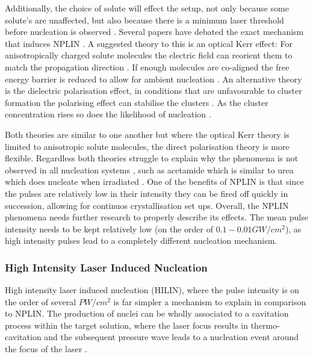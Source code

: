Additionally, the choice of solute will effect the setup, not 
only because some solute's are unaffected, but also because 
there is a minimum laser threshold before nucleation is observed 
\cite{Garetz2002}. Several papers have debated the exact mechanism 
that induces NPLIN \cite{Garetz2002, Knott2011}. A suggested 
theory to this is an optical Kerr effect: For anisotropically 
charged solute molecules the electric field can reorient them 
to match the propagation direction \cite{Garetz2002}. If enough 
molecules are co-aligned the free energy barrier is reduced to 
allow for ambient nucleation \cite{Knott2011}. An alternative 
theory is the dielectric polarisation effect, in conditions that 
are unfavourable to cluster formation the polarising effect can 
stabilise the clusters \cite{Alexander2008}. As the cluster 
concentration rises so does the likelihood of nucleation 
\cite{Vekilov2010}. 

Both theories are similar to one another but where the optical 
Kerr theory is limited to anisotropic solute molecules, the 
direct polarisation theory is more flexible. Regardless both 
theories struggle to explain why the phenomena is not observed 
in all nucleation systems \cite{Korede2023}, such as acetamide 
which is similar to urea which does nucleate when irradiated 
\cite{Ward2016}. One of the benefits of NPLIN is that since the 
pulses are relatively low in their intensity they can be fired 
off quickly in succession, allowing for continuos crystallisation 
set ups. Overall, the NPLIN phenomena needs further research to 
properly describe its effects. The mean pulse intensity needs to 
be kept relatively low (on the order of $0.1-0.01 GW/cm^2$), as 
high intensity pulses lead to a completely different nucleation 
mechanism.

\subsubsection{High Intensity Laser Induced Nucleation}
High intensity laser induced nucleation (HILIN), where the pulse 
intensity is on the order of several $PW/cm^2$ is far simpler a 
mechanism to explain in comparison to NPLIN. The production of 
nuclei can be wholly associated to a cavitation process within 
the target solution, where the laser focus results in thermo-
cavitation and the subsequent pressure wave leads to a nucleation 
event around the focus of the laser \cite{Yoshikawa2005, Soare2011, 
Barber2019}. 

